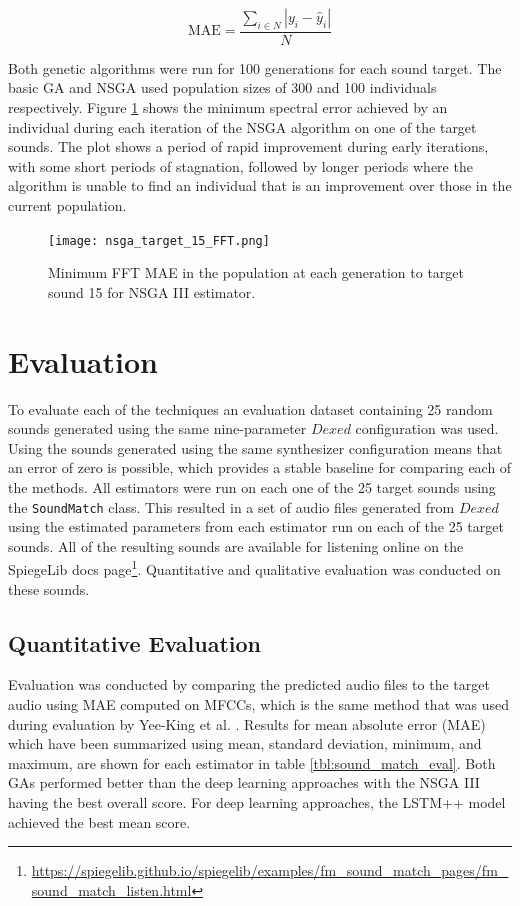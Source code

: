 \begin{equation}
    \text{MAE} = \frac{\sum_{i \in N}{|y_i - \hat{y}_i|}}{N}
\end{equation}

Both genetic algorithms were run for 100 generations for each sound target. The basic GA and NSGA used population sizes of 300 and 100 individuals respectively. Figure \ref{fig:nsga_fitness} shows the minimum spectral error achieved by an individual during each iteration of the NSGA algorithm on one of the target sounds. The plot shows a period of rapid improvement during early iterations, with some short periods of stagnation, followed by longer periods where the algorithm is unable to find an individual that is an improvement over those in the current population.


\begin{figure}[ht]
\begin{center}
\texttt{[image: nsga\_target\_15\_FFT.png]}
\caption{Minimum FFT MAE in the population at each generation to target sound 15 for NSGA III estimator.}
\label{fig:nsga_fitness}
\end{center}
\end{figure}

\section{Evaluation}
To evaluate each of the techniques an evaluation dataset containing 25 random sounds generated using the same nine-parameter $Dexed$ configuration was used. Using the sounds generated using the same synthesizer configuration means that an error of zero is possible, which provides a stable baseline for comparing each of the methods. All estimators were run on each one of the 25 target sounds using the \texttt{SoundMatch} class. This resulted in a set of audio files generated from $Dexed$ using the estimated parameters from each estimator run on each of the 25 target sounds. All of the resulting sounds are available for listening online on the SpiegeLib docs page\footnote{\url{https://spiegelib.github.io/spiegelib/examples/fm_sound_match_pages/fm_sound_match_listen.html}}. Quantitative and qualitative evaluation was conducted on these sounds.

\subsection{Quantitative Evaluation}
Evaluation was conducted by comparing the predicted audio files to the target audio using MAE computed on MFCCs, which is the same method that was used during evaluation by Yee-King et al. \cite{yee2018automatic}. Results for mean absolute error (MAE) which have been summarized using mean, standard deviation, minimum, and maximum, are shown for each estimator in table \ref{tbl:sound_match_eval}. Both GAs performed better than the deep learning approaches with the NSGA III having the best overall score. For deep learning approaches, the LSTM++ model achieved the best mean score.

